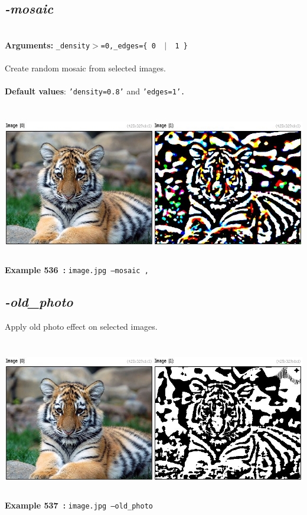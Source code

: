 \documentclass[a4paper,11pt,twoside]{book}
\begin{document}
\subsection{\emph{-mosaic} }\vspace*{-0.5em}
~\\\textbf{Arguments: } 
{\small \texttt{\_density$>$=0,\_edges=\{ 0 ~$|$~ 1 \}}}\\~\\
Create random mosaic from selected images.
~\\~\\\textbf{Default values}: {\small \texttt{'density=0.8'} and \texttt{'edges=1'.}}
\begin{center}\includegraphics[keepaspectratio=true,height=7cm,width=\textwidth]{img/gmic_def536.jpg}\\
{\footnotesize \textbf{Example 536~:} \texttt{image.jpg --mosaic ,}}
\end{center}

\subsection{\emph{-old\_photo} }\vspace*{-0.5em}
Apply old photo effect on selected images.
\begin{center}\includegraphics[keepaspectratio=true,height=7cm,width=\textwidth]{img/gmic_def537.jpg}\\
{\footnotesize \textbf{Example 537~:} \texttt{image.jpg --old\_photo}}
\end{center}
\end{document}
